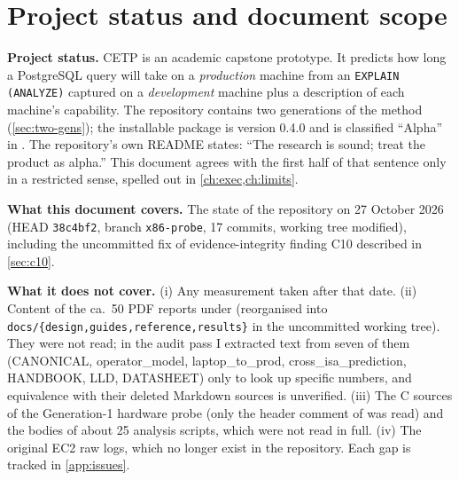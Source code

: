 \chapter*{Project status and document scope}

\textbf{Project status.} CETP is an academic capstone prototype. It predicts how long a PostgreSQL
query will take on a \emph{production} machine from an \texttt{EXPLAIN (ANALYZE)} captured on a
\emph{development} machine plus a description of each machine's capability. The repository contains
two generations of the method (\cref{sec:two-gens}); the installable package is version 0.4.0 and is
classified ``Alpha'' in . The repository's own README states: ``The research is
sound; treat the product as alpha.'' This document agrees with the first half of that sentence only
in a restricted sense, spelled out in \cref{ch:exec,ch:limits}.

\textbf{What this document covers.} The state of the repository on 27 October 2026 (HEAD
\texttt{38c4bf2}, branch \texttt{x86-probe}, 17 commits, working tree modified), including the
uncommitted fix of evidence-integrity finding C10 described in \cref{sec:c10}.

\textbf{What it does not cover.} (i) Any measurement taken after that date. (ii) Content of the ca.\ 50
PDF reports under  (reorganised into \texttt{docs/\{design,guides,reference,results\}} in the uncommitted working tree). They were not read; in the audit pass I extracted text from seven of them (CANONICAL, operator\_model, laptop\_to\_prod, cross\_isa\_prediction, HANDBOOK, LLD, DATASHEET) only to look up specific numbers, and equivalence with their deleted Markdown sources is unverified. (iii) The C
sources of the Generation-1 hardware probe (only the header comment of  was read) and the bodies of about 25 analysis scripts, which were not
read in full. (iv) The original EC2 raw logs, which no longer exist in the repository. Each gap is
tracked in \cref{app:issues}.

\tableofcontents
\listoffigures
\listoftables

